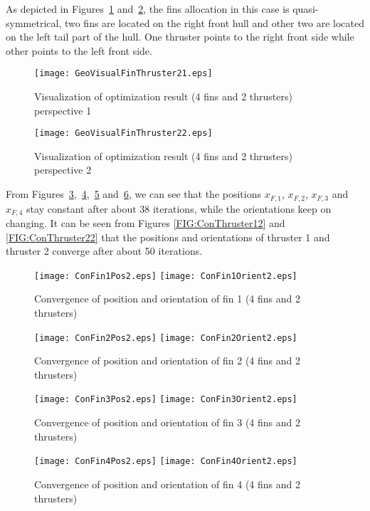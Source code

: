 As depicted in Figures~\ref{FIG:GeoVisualFinThruster21} and~\ref{FIG:GeoVisualFinThruster22}, the fins allocation in this case is quasi-symmetrical, two fins are located on the right front hull and other two are located on the left tail part of the hull. One thruster points to the right front side while other points to the left front side.  
\begin{figure}
\center
\texttt{[image: GeoVisualFinThruster21.eps]}
\caption{Visualization of optimization result (4 fins and 2 thrusters) perspective 1}	
\label{FIG:GeoVisualFinThruster21}
\end{figure}
\begin{figure}
\texttt{[image: GeoVisualFinThruster22.eps]}
\caption{Visualization of optimization result (4 fins and 2 thrusters) perspective 2}	
\label{FIG:GeoVisualFinThruster22}
\end{figure}
From Figures~\ref{FIG:ConFin12},~\ref{FIG:ConFin22},~\ref{FIG:ConFin32} and~\ref{FIG:ConFin42}, we can see that the positions $x_{F,1}$, $x_{F,2}$, $x_{F,3}$ and $x_{F,4}$ stay constant after about 38 iterations, while the orientations keep on changing. It can be seen from Figures \ref{FIG:ConThruster12} and \ref{FIG:ConThruster22} that the positions and orientations of thruster 1 and thruster 2 converge after about 50 iterations. 
\begin{figure}
\texttt{[image: ConFin1Pos2.eps]}
\texttt{[image: ConFin1Orient2.eps]}
\caption{Convergence of position and orientation of fin 1 (4 fins and 2 thrusters)}	
\label{FIG:ConFin12}
\end{figure}
\begin{figure}
\texttt{[image: ConFin2Pos2.eps]}
\texttt{[image: ConFin2Orient2.eps]}
\caption{Convergence of position and orientation of fin 2 (4 fins and 2 thrusters)}	
\label{FIG:ConFin22}
\end{figure}
\begin{figure}
\texttt{[image: ConFin3Pos2.eps]}
\texttt{[image: ConFin3Orient2.eps]}
\caption{Convergence of position and orientation of fin 3 (4 fins and 2 thrusters)}	
\label{FIG:ConFin32}
\end{figure}
\begin{figure}
\texttt{[image: ConFin4Pos2.eps]}
\texttt{[image: ConFin4Orient2.eps]}
\caption{Convergence of position and orientation of fin 4 (4 fins and 2 thrusters)}	
\label{FIG:ConFin42}
\end{figure}

